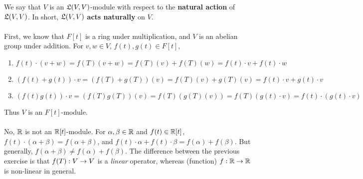 We say that $V$ is an $\mathfrak{L}(V, V)$-module with respect to the \textbf{natural action} of $\mathfrak{L}(V, V)$. In short, $\mathfrak{L}(V, V)$ \textbf{acts naturally} on $V$.\\
\\
 First, we know that $F[t]$ is a ring under multiplication, and $V$ is an abelian group under addition. For $v, w\in V$, $f(t), g(t)\in F[t]$,
\begin{enumerate}
	\item $f(t)\cdot (v+w) = f(T)(v+w) = f(T)(v)+f(T)(w) = f(t)\cdot v + f(t)\cdot w$
	\item $(f(t)+g(t))\cdot v = (f(T) + g(T))(v) = f(T)(v) + g(T)(v) = f(t)\cdot v + g(t)\cdot v$
	\item $(f(t)g(t))\cdot v = (f(T)g(T))(v) = f(T)(g(T)(v)) = f(T)(g(t)\cdot v) = f(t)\cdot (g(t)\cdot v)$
\end{enumerate}
Thus $V$ is an $F[t]$-module.\\
\\
 No, $\mathbb{R}$ is not an $\mathbb{R}[t]$-module. For $\alpha, \beta\in \mathbb{R}$ and $f(t)\in \mathbb{R}[t]$, $f(t)\cdot(\alpha + \beta) = f(\alpha + \beta)$, and $f(t)\cdot \alpha + f(t)\cdot \beta = f(\alpha) + f(\beta)$.
But generally, $f(\alpha + \beta) \neq f(\alpha) + f(\beta)$. The difference between the previous exercise is that $f(T) : V\rightarrow V$ is a \textit{linear} operator, whereas (function) $f: \mathbb{R} \rightarrow \mathbb{R}$ is non-linear in general.\\

